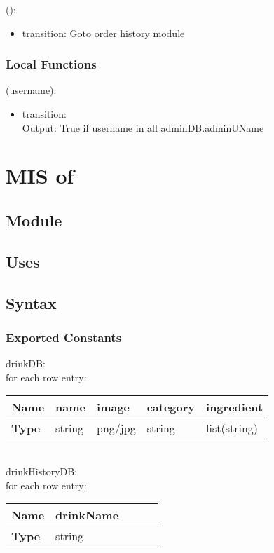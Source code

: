 \documentclass[12pt, titlepage]{article}
\begin{document}
\noindent {}():
\begin{itemize}
\item transition: Goto order history module
\end{itemize}


\subsubsection{Local Functions}

\noindent {}(username):
\begin{itemize}
\item transition:\\Output: True if username in all adminDB.adminUName
\end{itemize}

\newpage

\section{MIS of } \label{Module}

\subsection{Module}


\subsection{Uses}


\subsection{Syntax}

\subsubsection{Exported Constants}

drinkDB:\\
for each row entry:\\
\begin{center}
\begin{tabular}{p{2cm} p{3cm} p{3cm} p{3cm} p{3cm}}
\hline
\textbf{Name} & name & image & category & ingredient \\
\hline
\textbf{Type} & string & png/jpg & string & list(string) \\
\hline
\end{tabular}
\end{center}
\\
drinkHistoryDB:\\
for each row entry:\\
\begin{center}
\begin{tabular}{p{2cm} p{3cm} p{3cm} p{3cm} p{3cm}}
\hline
\textbf{Name} & drinkName \\
\hline
\textbf{Type} & string \\
\hline
\end{tabular}
\end{center}
\end{document}
